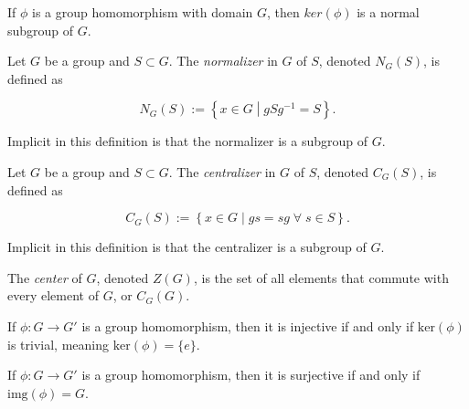 \begin{theorem}
    \label{theorem : Kernel_normal}
    \leanok
    If $\phi$ is a group homomorphism with domain $G$, then $ker(\phi)$ is a normal subgroup of $G$.
\end{theorem}

\begin{definition}
    \label{definition : Normalizer}
    \leanok
    Let $G$ be a group and $S \subset G$. The \textit{normalizer} in $G$ of $S$, denoted $N_G(S)$, is defined as

    $$N_G(S) := \left\{ x \in G \middle| gSg^{-1} = S \right\}.$$

    Implicit in this definition is that the normalizer is a subgroup of $G$.
\end{definition}

\begin{definition}
    \label{definition : Centralizer}
    \leanok
    Let $G$ be a group and $S \subset G$. The \textit{centralizer} in $G$ of $S$, denoted $C_G(S)$, is defined as

    $$C_G(S) := \left\{ x \in G \middle| gs = sg\;\forall\;s \in S\right\}.$$

    Implicit in this definition is that the centralizer is a subgroup of $G$.
\end{definition}

\begin{definition}
    \label{definition : Center}
    \leanok
    The \textit{center} of $G$, denoted $Z(G)$, is the set of all elements that commute with every element of $G$, or $C_G(G)$.
\end{definition}

\begin{theorem}
    \label{theorem : homomorphism_inj_iff_kernel_trivial}
    \leanok
    If $\phi : G \rightarrow G'$ is a group homomorphism, then it is injective if and only if $\text{ker}(\phi)$ is trivial, meaning $\text{ker}(\phi) = \{e\}$.
\end{theorem}

\begin{theorem}
    \label{theorem : homomorphism_surj_iff_image_complete}
    \leanok
    If $\phi : G \rightarrow G'$ is a group homomorphism, then it is surjective if and only if $\text{img}(\phi) = G$.
\end{theorem}
